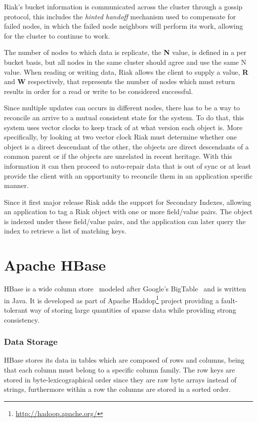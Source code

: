 Riak's bucket information is communicated across the cluster through a gossip protocol, this includes the \emph{hinted handoff} mechanism used to compensate for failed nodes, in which the failed node neighbors will perform its work, allowing for the cluster to continue to work.  

The number of nodes to which data is replicate, the \textbf{N} value, is defined in a per bucket basis, but all nodes in the same cluster should agree and use the same N value. When reading or writing data, Riak allows the client to supply a value, \textbf{R} and \textbf{W} respectively, that represents the number of nodes which must return results in order for a read or write to be considered successful. 

Since multiple updates can occurs in different nodes, there has to be a way to reconcile an arrive to a mutual consistent state for the system. To do that, this system uses vector clocks to keep track of at what version each object is. More specifically, by looking at two vector clock Riak must determine whether one object is a direct descendant of the other, the objects are direct descendants of a common parent or if the objects are unrelated in recent heritage. With this information it can then proceed to auto-repair data that is out of sync or at least provide the client with an opportunity to reconcile them in an application specific manner. 

Since it first major release Riak adds the support for Secondary Indexes, allowing an application to tag a Riak object with one or more field/value pairs. The object is indexed under these field/value pairs, and the application can later query the index to retrieve a list of matching keys.

\section{Apache HBase}
HBase is a wide column store~\cite{nosqlOrg} modeled after Google's BigTable~\cite{Chang2008} and is written in Java. It is developed as part of Apache Haddop\footnote{\url{http://hadoop.apache.org/}} project providing a fault-tolerant way of storing large quantities of sparse data while providing strong consistency. 

\subsubsection{Data Storage}
HBase stores its data in tables which are composed of rows and columns, being that each column must belong to a specific column family. The row keys are stored in byte-lexicographical order since they are raw byte arrays instead of strings, furthermore within a row the columns are stored in a sorted order.

